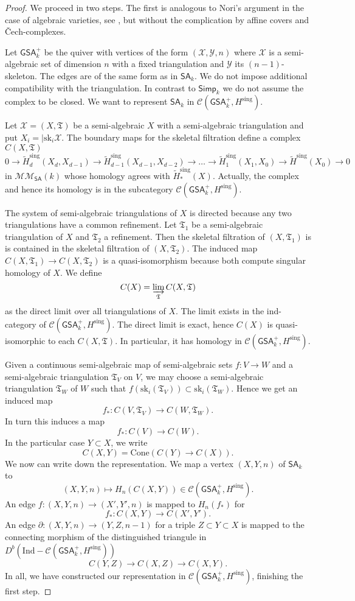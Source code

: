 \documentclass[11pt,a4paper]{amsart}
\theoremstyle{definition}
\newcommand{\MMSA}{\mathcal{MM}_{\SA}}
\newcommand{\Ch}{\mathcal{C}}
\newcommand{\Xh}{\mathcal{X}}
\newcommand{\Yh}{\mathcal{Y}}
\newcommand{\cone}{\mathrm{Cone}}
\newcommand{\Ind}{\mathrm{Ind}}
\newcommand{\sk}{\mathrm{sk}}
\newcommand{\sing}{\mathrm{sing}}
\newcommand{\Hsing}{H^\sing}
\newcommand{\Hsingtilde}{\tilde{H}^\sing}
\newcommand{\SA}{\mathsf{SA}}
\newcommand{\GSA}{\mathsf{GSA}}
\newcommand{\Simp}{\mathsf{Simp}}
\newcommand{\fT}{\mathfrak{T}}
\begin{document}
\begin{proof}
We proceed in two steps. 
The first is analogous to Nori's argument in the case of algebraic varieties, see  \cite[Theorem~9.2.22]{period-buch}, but without the complication by affine covers and \v{C}ech-complexes.

Let $\GSA^+_k$ be the quiver with vertices of the form
$(\Xh,\Yh,n)$ where 
$\Xh$ is a semi-algebraic set of dimension $n$ with a fixed triangulation and
$\Yh$ its $(n-1)$-skeleton. The edges are of the same form as in
$\SA_k$. We do not impose additional compatibility with the triangulation.
In contrast to $\Simp_k$ we do not assume the complex to be closed.
We want to represent $\SA_k$ in $\Ch(\GSA_k^+,\Hsing)$.

Let $\Xh=(X,\fT)$ be a semi-algebraic $X$ with a semi-algebraic triangulation
and put  $X_i=|\sk_i\Xh$.
The boundary maps for  the skeletal filtration define a complex
$C(X,\fT)$
\begin{equation*}\label{eq:good_complex}
 0\to \Hsingtilde_d(X_d,X_{d-1})\to \Hsingtilde_{d-1}(X_{d-1},X_{d-2})\to\dots\to \Hsingtilde_1(X_1,X_0)\to \Hsingtilde(X_0)\to 0
\end{equation*}
in $\MMSA(k)$ whose homology agrees with $\Hsingtilde_*(X)$.
Actually, the complex and hence its homology is in the subcategory
$\Ch(\GSA^+_k,\Hsing)$.

The system of semi-algebraic triangulations
of $X$ is directed because any two triangulations have a common refinement.
Let $\fT_1$ be a semi-algebraic triangulation of $X$ and $\fT_2$ 
 a refinement. Then the skeletal filtration of
$(X,\fT_1)$ is is contained in the skeletal filtration of $(X,\fT_2)$.
The induced map $C(X,\fT_1)\to C(X,\fT_2)$ is a quasi-isomorphism because both
compute singular homology of $X$.
We define
\[ C(X)=\varinjlim_{\fT}C(X,\fT)\]
as the direct limit over all triangulations of $X$. The limit exists
in the ind-category of $\Ch(\GSA_k^+,\Hsing)$. The direct limit is exact, hence $C(X)$ is quasi-isomorphic to each $C(X,\fT)$. In particular, it has
homology in
$\Ch(\GSA_k^+,\Hsing)$. 

Given a continuous semi-algebraic map of semi-algebraic sets
$f:V\to W$ and a semi-algebraic triangulation $\fT_V$ on $V$,
we may choose a semi-algebraic triangulation $\fT_W$ of $W$ such that
$f(\sk_i(\fT_V))\subset\sk_i(\fT_W)$. Hence we get an induced map
\[ f_*:C(V,\fT_V)\to C(W,\fT_W).\]
In turn this induces a map
\[ f_*:C(V)\to C(W).\]
In the particular case $Y\subset X$, we write
\[ C(X,Y)=\cone\left( C(Y)\to C(X)\right).\]
We now can write down the representation. We map a vertex $(X,Y,n)$ of
$\SA_k$ to
\[ (X,Y,n)\mapsto H_n(C(X,Y))\in\Ch(\GSA_k^+,\Hsing).\]
An edge $f:(X,Y,n)\to (X',Y',n)$ is mapped to $H_n(f_*)$ for
\[ f_*:C(X,Y)\to C(X',Y').\]
An edge $\partial:(X,Y,n)\to (Y,Z,n-1)$ for  a triple
$Z\subset Y\subset X$ is mapped to the connecting morphism of the
distinguished triangule in $D^b(\Ind-\Ch(\GSA_k^+,\Hsing))$
\[ C(Y,Z)\to C(X,Z)\to C(X,Y).\]
In all, we have constructed our representation in $\Ch(\GSA_k^+,\Hsing)$, finishing the first step.


\end{proof}
\end{document}
